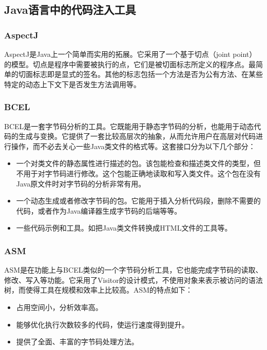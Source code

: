 \subsection{Java语言中的代码注入工具}
\subsubsection{AspectJ}

AspectJ\cite{aspectJ}是Java上一个简单而实用的拓展。它采用了一个基于切点（joint point）的模型。切点是程序中需要被执行的点，它们是被切面标志所定义的程序点。最简单的切面标志即是显式的签名。其他的标志包括一个方法是否为公有方法、在某些特定的动态上下文下是否发生方法调用等。

\subsubsection{BCEL}

BCEL\cite{bcel}是一套字节码分析的工具。它既能用于静态字节码的分析，也能用于动态代码的生成与变换。它提供了一套比较高层次的抽象，从而允许用户在高层对代码进行操作，而不必去关心一些Java类文件的格式等。这套接口分为以下几个部分：

\begin{itemize}
	\item 一个对类文件的静态属性进行描述的包。该包能检查和描述类文件的类型，但不用于对字节码进行修改。这个包能正确地读取和写入类文件。这个包在没有Java原文件时对字节码的分析非常有用。
	\item 一个动态生成或者修改字节码的包。它能用于插入分析代码段，删除不需要的代码，或者作为Java编译器生成字节码的后端等等。
	\item 一些代码示例和工具。如把Java类文件转换成HTML文件的工具等。
\end{itemize}

\subsubsection{ASM}

ASM\cite{asm}是在功能上与BCEL类似的一个字节码分析工具，它也能完成字节码的读取、修改、写入等功能。它采用了Visitor的设计模式，不使用对象来表示被访问的语法树，而使得工具在规模和效率上比较高。ASM的特点如下：

\begin{itemize}
	\item 占用空间小，分析效率高。
	\item 能够优化执行次数较多的代码，使运行速度得到提升。
	\item 提供了全面、丰富的字节码处理方法。
\end{itemize}

